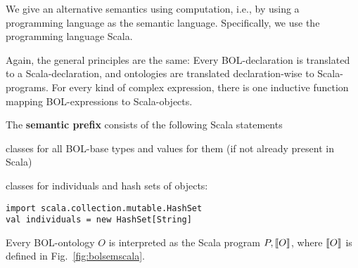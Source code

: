 We give an alternative semantics using computation, i.e., by using a programming language as the semantic language.
Specifically, we use the programming language Scala.

Again, the general principles are the same:
Every BOL-declaration is translated to a Scala-declaration, and ontologies are translated declaration-wise to Scala-programs.
For every kind of complex expression, there is one inductive function mapping BOL-expressions to Scala-objects.

\begin{definition}\label{def:bolsem:scala}
The \textbf{semantic prefix} consists of the following Scala statements
\begin{compactitem}
 \item classes for all BOL-base types and values for them (if not already present in Scala)
 \item classes for individuals and hash sets of objects:
\begin{lstlisting}
import scala.collection.mutable.HashSet
val individuals = new HashSet[String]
\end{lstlisting}
\end{compactitem}

Every BOL-ontology $O$ is interpreted as the Scala program $P,\llbracket O\rrbracket$, where $\llbracket O\rrbracket$ is defined in Fig.~\ref{fig:bolsemscala}.
\end{definition}

\newcommand{\rA}{\Rightarrow}

